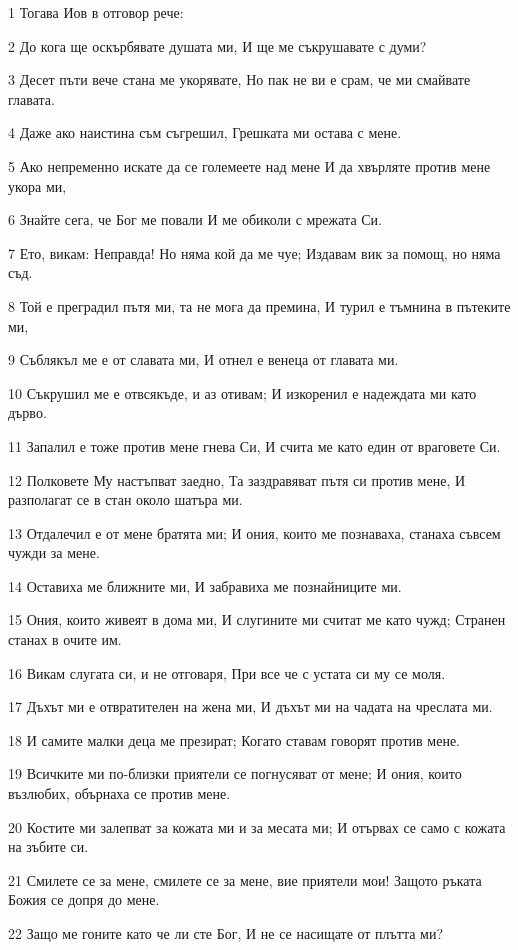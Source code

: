 \par 1 Тогава Иов в отговор рече:
\par 2 До кога ще оскърбявате душата ми, И ще ме съкрушавате с думи?
\par 3 Десет пъти вече стана ме укорявате, Но пак не ви е срам, че ми смайвате главата.
\par 4 Даже ако наистина съм съгрешил, Грешката ми остава с мене.
\par 5 Ако непременно искате да се големеете над мене И да хвърляте против мене укора ми,
\par 6 Знайте сега, че Бог ме повали И ме обиколи с мрежата Си.
\par 7 Ето, викам: Неправда! Но няма кой да ме чуе; Издавам вик за помощ, но няма съд.
\par 8 Той е преградил пътя ми, та не мога да премина, И турил е тъмнина в пътеките ми,
\par 9 Съблякъл ме е от славата ми, И отнел е венеца от главата ми.
\par 10 Съкрушил ме е отвсякъде, и аз отивам; И изкоренил е надеждата ми като дърво.
\par 11 Запалил е тоже против мене гнева Си, И счита ме като един от враговете Си.
\par 12 Полковете Му настъпват заедно, Та заздравяват пътя си против мене, И разполагат се в стан около шатъра ми.
\par 13 Отдалечил е от мене братята ми; И ония, които ме познаваха, станаха съвсем чужди за мене.
\par 14 Оставиха ме ближните ми, И забравиха ме познайниците ми.
\par 15 Ония, които живеят в дома ми, И слугините ми считат ме като чужд; Странен станах в очите им.
\par 16 Викам слугата си, и не отговаря, При все че с устата си му се моля.
\par 17 Дъхът ми е отвратителен на жена ми, И дъхът ми на чадата на чреслата ми.
\par 18 И самите малки деца ме презират; Когато ставам говорят против мене.
\par 19 Всичките ми по-близки приятели се погнусяват от мене; И ония, които възлюбих, обърнаха се против мене.
\par 20 Костите ми залепват за кожата ми и за месата ми; И отървах се само с кожата на зъбите си.
\par 21 Смилете се за мене, смилете се за мене, вие приятели мои! Защото ръката Божия се допря до мене.
\par 22 Защо ме гоните като че ли сте Бог, И не се насищате от плътта ми?
